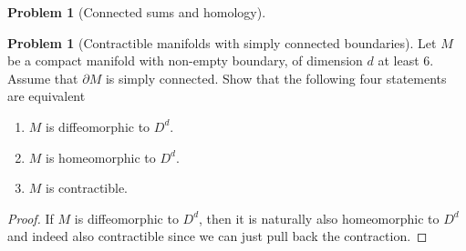 \documentclass[reqno]{amsart}
\theoremstyle{definition}
\newtheorem{problem}[theorem]{Problem}
\theoremstyle{remark}
\begin{document}
\begin{problem}[Connected sums and homology]
\begin{problem}[Contractible manifolds with simply
           connected boundaries]
           Let $M$ be a compact manifold with non-empty
           boundary, of dimension $d$ at least
           $6$. Assume that  $\partial M$ is simply
           connected. Show that the following four
           statements are equivalent
           \begin{enumerate}
               \item $M$ is diffeomorphic to
                   $D^{d}$.
               \item $M$ is homeomorphic to $D^{d}$.
               \item $M$ is contractible.
           \end{enumerate}
\end{problem}

       \begin{proof}
           If $M$ is diffeomorphic to $D^{d}$, then
           it is naturally also homeomorphic to $D^{d}$ and
           indeed also contractible since we can
           just pull back the contraction.


\end{proof}
\end{problem}
\end{document}
